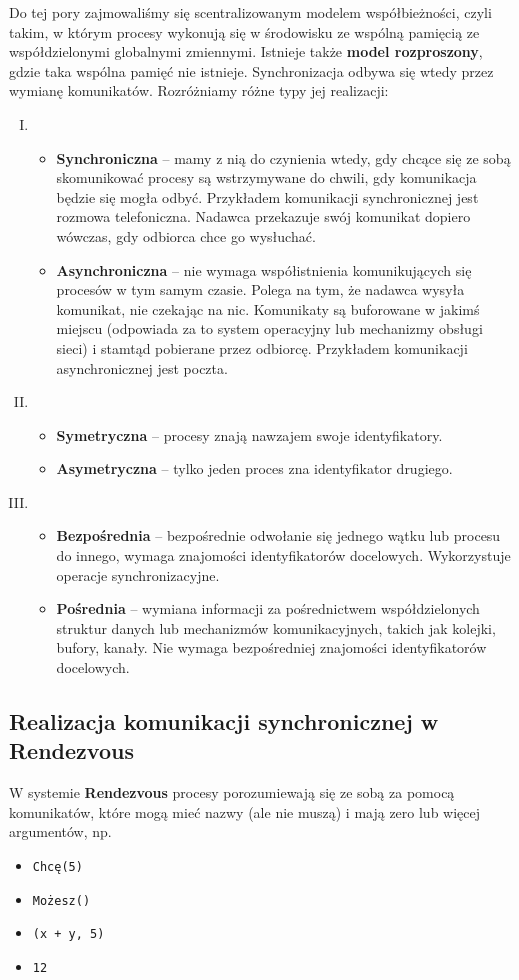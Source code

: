 Do tej pory zajmowaliśmy się scentralizowanym modelem współbieżności, czyli takim, w którym procesy wykonują się w środowisku ze wspólną pamięcią ze współdzielonymi globalnymi zmiennymi. Istnieje także \textbf{model rozproszony}, gdzie taka wspólna pamięć nie istnieje. Synchronizacja odbywa się wtedy przez wymianę komunikatów. Rozróżniamy różne typy jej realizacji:
\begin{enumerate} [I.]
    \item \begin{itemize}
        \item \textbf{Synchroniczna} -- mamy z nią do czynienia wtedy, gdy chcące się ze sobą skomunikować procesy są wstrzymywane do chwili, gdy komunikacja będzie się mogła odbyć. Przykładem komunikacji synchronicznej jest rozmowa telefoniczna. Nadawca przekazuje swój komunikat dopiero wówczas, gdy odbiorca chce go wysłuchać.
        \item \textbf{Asynchroniczna} -- nie wymaga współistnienia komunikujących się procesów w tym samym czasie. Polega na tym, że nadawca wysyła komunikat, nie czekając na nic. Komunikaty są buforowane w jakimś miejscu (odpowiada za to system operacyjny lub mechanizmy obsługi sieci) i stamtąd pobierane przez odbiorcę. Przykładem komunikacji asynchronicznej jest poczta.
    \end{itemize}
    \item \begin{itemize}
        \item \textbf{Symetryczna} -- procesy znają nawzajem swoje identyfikatory.
        \item \textbf{Asymetryczna} -- tylko jeden proces zna identyfikator drugiego.
    \end{itemize}
    \item \begin{itemize}
        \item \textbf{Bezpośrednia} -- bezpośrednie odwołanie się jednego wątku lub procesu do innego, wymaga znajomości identyfikatorów docelowych. Wykorzystuje operacje synchronizacyjne.
        \item \textbf{Pośrednia} -- wymiana informacji za pośrednictwem współdzielonych struktur danych lub mechanizmów komunikacyjnych, takich jak kolejki, bufory, kanały. Nie wymaga bezpośredniej znajomości identyfikatorów docelowych. 
    \end{itemize}
\end{enumerate}

\subsection{Realizacja komunikacji synchronicznej w  Rendezvous}
W systemie \textbf{Rendezvous} procesy porozumiewają się ze sobą za pomocą komunikatów, które mogą mieć nazwy (ale nie muszą) i mają zero lub więcej argumentów, np.
\begin{itemize}
    \item \texttt{Chcę(5)}
    \item \texttt{Możesz()}
    \item \texttt{(x + y, 5)}
    \item \texttt{12}
\end{itemize}


